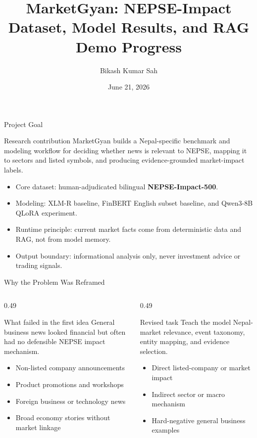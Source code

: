 \documentclass[aspectratio=169,11pt,hyperref={bookmarks=false}]{beamer}
\title[MarketGyan]{MarketGyan: NEPSE-Impact Dataset, Model Results, and RAG Demo Progress}
\author{Bikash Kumar Sah}
\institute{Project Supervisor Discussion}
\date{June 21, 2026}
\newcommand{\smallsep}{\vspace{0.35em}}
\begin{document}
\begin{frame}
  \titlepage
\end{frame}

\begin{frame}{Project Goal}
  \begin{block}{Research contribution}
    MarketGyan builds a Nepal-specific benchmark and modeling workflow for deciding whether news is relevant to NEPSE, mapping it to sectors and listed symbols, and producing evidence-grounded market-impact labels.
  \end{block}
  \smallsep
  \begin{itemize}
    \item Core dataset: human-adjudicated bilingual \textbf{NEPSE-Impact-500}.
    \item Modeling: XLM-R baseline, FinBERT English subset baseline, and Qwen3-8B QLoRA experiment.
    \item Runtime principle: current market facts come from deterministic data and RAG, not from model memory.
    \item Output boundary: informational analysis only, never investment advice or trading signals.
  \end{itemize}
\end{frame}

\begin{frame}{Why the Problem Was Reframed}
  \begin{columns}[T]
    \begin{column}{0.49\textwidth}
      \begin{block}{What failed in the first idea}
        General business news looked financial but often had no defensible NEPSE impact mechanism.
      \end{block}
      \begin{itemize}
        \item Non-listed company announcements
        \item Product promotions and workshops
        \item Foreign business or technology news
        \item Broad economy stories without market linkage
      \end{itemize}
    \end{column}
    \begin{column}{0.49\textwidth}
      \begin{block}{Revised task}
        Teach the model Nepal-market relevance, event taxonomy, entity mapping, and evidence selection.
      \end{block}
      \begin{itemize}
        \item Direct listed-company or market impact
        \item Indirect sector or macro mechanism
        \item Hard-negative general business examples
      \end{itemize}
    \end{column}
  \end{columns}
\end{frame}
\end{document}
